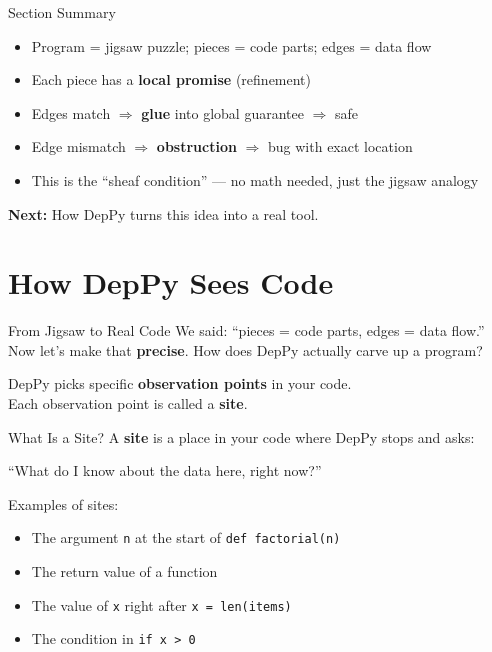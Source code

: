 \documentclass[aspectratio=169,10pt]{beamer}
\begin{document}
\begin{frame}{Section Summary}
\begin{itemize}
  \item Program = jigsaw puzzle; pieces = code parts; edges = data flow
  \item Each piece has a \textbf{local promise} (refinement)
  \item Edges match $\Rightarrow$ \textbf{glue} into global guarantee $\Rightarrow$ safe
  \item Edge mismatch $\Rightarrow$ \textbf{obstruction} $\Rightarrow$ bug with exact location
  \item This is the ``sheaf condition'' --- no math needed, just the jigsaw analogy
\end{itemize}
\vspace{0.3em}
\begin{center}
\textbf{Next:} How DepPy turns this idea into a real tool.
\end{center}
\end{frame}

\section{How DepPy Sees Code}

\begin{frame}{From Jigsaw to Real Code}
We said: ``pieces = code parts, edges = data flow.''\\[0.3em]
Now let's make that \textbf{precise}. How does DepPy actually carve up a program?
\vspace{0.5em}
\begin{center}
DepPy picks specific \textbf{observation points} in your code.\\
Each observation point is called a \textbf{site}.
\end{center}
\end{frame}

\begin{frame}{What Is a Site?}
A \textbf{site} is a place in your code where DepPy stops and asks:
\begin{center}
``What do I know about the data here, right now?''
\end{center}
\vspace{0.5em}
Examples of sites:
\begin{itemize}
  \item The argument \texttt{n} at the start of \texttt{def factorial(n)}
  \item The return value of a function
  \item The value of \texttt{x} right after \texttt{x = len(items)}
  \item The condition in \texttt{if x > 0}
\end{itemize}
\end{frame}
\end{document}
